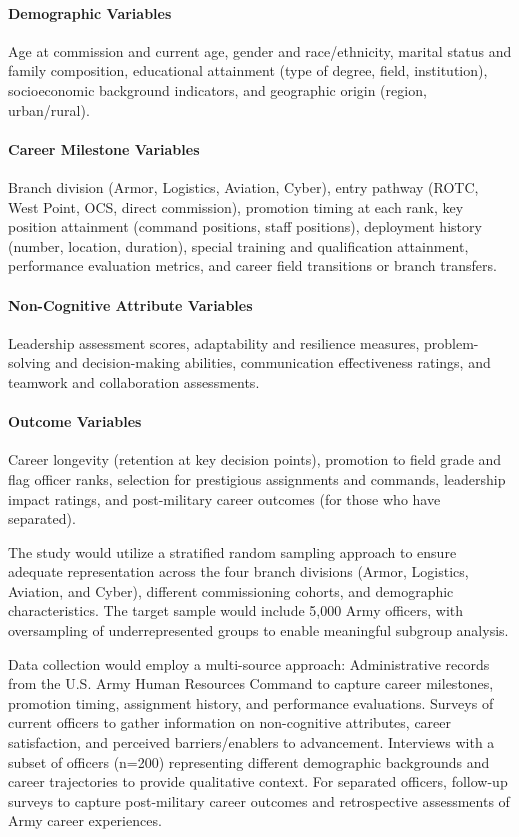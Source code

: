 \documentclass[../main.tex]{subfiles}
\begin{document}
\paragraph{Demographic Variables} Age at commission and current age, gender and race/ethnicity, marital status and family composition, educational attainment (type of degree, field, institution), socioeconomic background indicators, and geographic origin (region, urban/rural).

\paragraph{Career Milestone Variables} Branch division (Armor, Logistics, Aviation, Cyber), entry pathway (ROTC, West Point, OCS, direct commission), promotion timing at each rank, key position attainment (command positions, staff positions), deployment history (number, location, duration), special training and qualification attainment, performance evaluation metrics, and career field transitions or branch transfers.

\paragraph{Non-Cognitive Attribute Variables} Leadership assessment scores, adaptability and resilience measures, problem-solving and decision-making abilities, communication effectiveness ratings, and teamwork and collaboration assessments.

\paragraph{Outcome Variables} Career longevity (retention at key decision points), promotion to field grade and flag officer ranks, selection for prestigious assignments and commands, leadership impact ratings, and post-military career outcomes (for those who have separated).


The study would utilize a stratified random sampling approach to ensure adequate representation across the four branch divisions (Armor, Logistics, Aviation, and Cyber), different commissioning cohorts, and demographic characteristics. The target sample would include 5,000 Army officers, with oversampling of underrepresented groups to enable meaningful subgroup analysis.

Data collection would employ a multi-source approach: Administrative records from the U.S. Army Human Resources Command to capture career milestones, promotion timing, assignment history, and performance evaluations. Surveys of current officers to gather information on non-cognitive attributes, career satisfaction, and perceived barriers/enablers to advancement. Interviews with a subset of officers (n=200) representing different demographic backgrounds and career trajectories to provide qualitative context. For separated officers, follow-up surveys to capture post-military career outcomes and retrospective assessments of Army career experiences.
\end{document}
